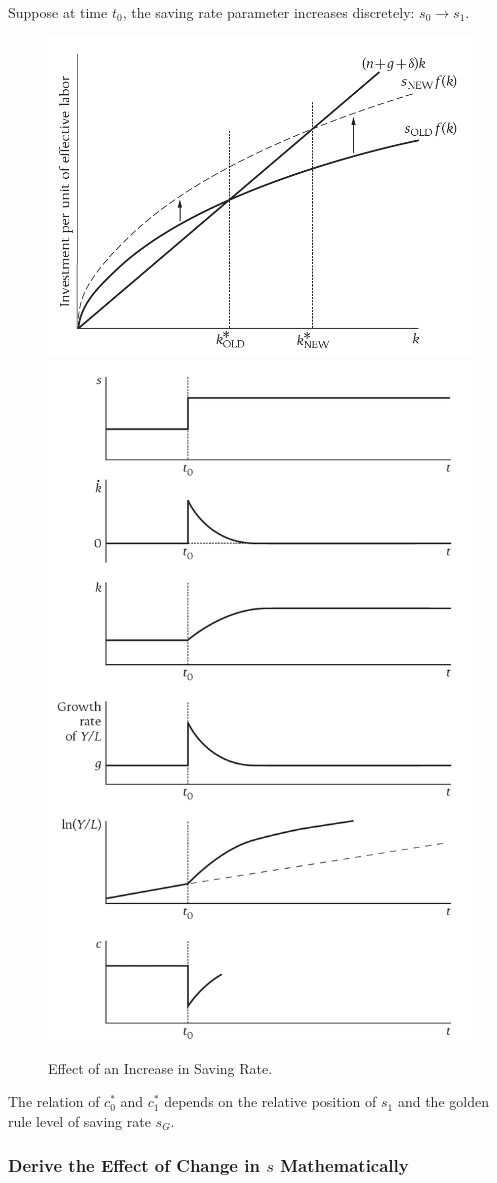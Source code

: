 \documentclass[]{article}
\begin{document}
			\paragraph{} Suppose at time $t_0$, the saving rate parameter increases discretely: $s_0 \rightarrow s_1$.
			\begin{figure}
				\centering
				\includegraphics[width=0.5\linewidth]{figures/3_3.png}
				\includegraphics[width=0.5\linewidth]{figures/3_4.png}
				\caption{Effect of an Increase in Saving Rate.}
			\end{figure}
			
			\begin{remark}
				The relation of $c_0^*$ and $c_1^*$ depends on the relative position of $s_1$ and the golden rule level of saving rate $s_G$.
			\end{remark}
			
			\subsubsection{Derive the Effect of Change in $s$ Mathematically}
\end{document}

